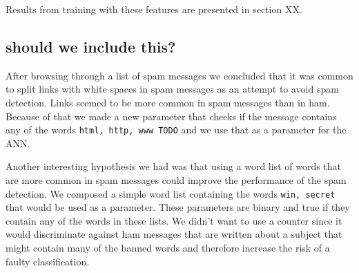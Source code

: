   Results from training with these features are presented in section XX.

  \subsection{should we include this?}
  After browsing through a list of spam messages we concluded that it was
  common to split links with white spaces in spam messages as an attempt to
  avoid spam detection. Links seemed to be more common in spam messages than in
  ham. Because of that we made a new parameter that checks if the message
  contains any of the words \texttt{html, http, www TODO} and we use that as a
  parameter for the ANN. 

  Another interesting hypothesis we had was that using a word list of words
  that are more common in spam messages could improve the performance of the
  spam detection. We composed a simple word list containing the words
  \texttt{win, secret} that would be used as a parameter.  These parameters are
  binary and true if they contain any of the words in these lists. We didn't
  want to use a counter since it would discriminate against ham messages that
  are written about a subject that might contain many of the banned words and
  therefore increase the risk of a faulty classification. 



